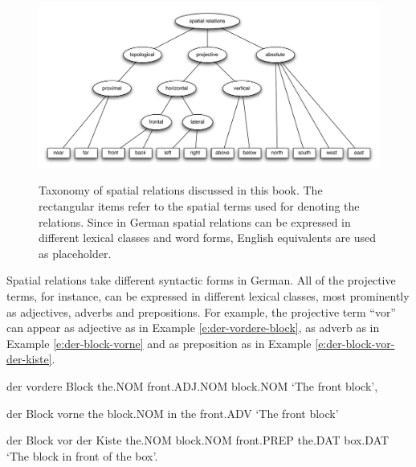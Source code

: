 \begin{figure}
\includegraphics[width=\columnwidth]{figs/spatial-relations-taxonomy}
\label{f:spatial-relations-taxonomy}
\caption[Taxonomy of spatial relations in German.]{
Taxonomy of spatial relations discussed in this book.
The rectangular items refer to the spatial terms used for denoting
the relations. Since in German spatial relations can be expressed in
different lexical classes and word forms, English
equivalents are used as placeholder.}
\end{figure}


Spatial relations take different syntactic forms in German. 
All of the projective terms, for instance, can be expressed in different 
lexical classes, most prominently as adjectives, adverbs and prepositions. 
For example, the projective term ``vor'' can appear as adjective as in 
Example \ref{e:der-vordere-block}, as adverb as in Example \ref{e:der-block-vorne} 
and as preposition as in Example \ref{e:der-block-vor-der-kiste}. 
\begin{example}
\label{e:der-vordere-block}
\gll der vordere Block 
the.NOM front.ADJ.NOM block.NOM 
\glt `The front block',
\glend
\end{example}
\begin{example}
\label{e:der-block-vorne}
\gll der Block vorne 
the block.NOM in the front.ADV 
\glt `The front block' 
\glend
\end{example}
\begin{example}
\label{e:der-block-vor-der-kiste}
\gll der Block vor der Kiste 
the.NOM block.NOM front.PREP the.DAT box.DAT 
\glt `The block in front of the box'.
\glend
\end{example}

